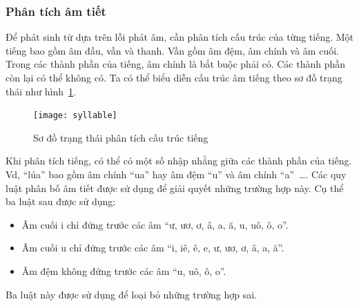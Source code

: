 \documentclass[a4paper,oneside,14pt]{extbook} %
\begin{document}


\subsubsection{Phân tích âm tiết}
\label{sec:realword:syllable}

Để phát sinh từ dựa trên lỗi phát âm, cần phân tích cấu trúc của từng
tiếng. Một tiếng bao gồm âm đầu, vần và thanh. Vần gồm âm đệm, âm
chính và âm cuối. Trong các thành phần của tiếng, âm chính là bắt buộc
phải có. Các thành phần còn lại có thể không có. Ta có thể biểu diễn
cấu trúc âm tiếng theo sơ đồ trạng thái như hình~\ref{fig:syllable}.

\begin{figure}[htbp]
  \centering
  \texttt{[image: syllable]}
  \caption{Sơ đồ trạng thái phân tích cấu trúc tiếng}
  \label{fig:syllable}
\end{figure}

Khi phân tích tiếng, có thể có một số nhập nhằng giữa các thành phần
của tiếng. Vd, ``lúa'' bao gồm âm chính ``ua'' hay âm đệm ``u'' và âm
chính ``a''~\ldots{}. Các quy luật phân bố âm tiết được sử dụng để
giải quyết những trường hợp này. Cụ thể ba luật sau được sử dụng:
\begin{itemize}
\item Âm cuối i chỉ đứng trước các âm ``ư, ươ, ơ, â, a, ă, u, uô, ô,
  o''.
\item Âm cuối u chỉ đứng trước các âm ``i, iê, ê, e, ư, ươ, ơ, â, a,
  ă''.
\item Âm đệm không đứng trước các âm ``u, uô, ô, o''.
\end{itemize}
Ba luật này được sử dụng để loại bỏ những trường hợp sai.
\end{document}
